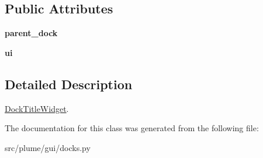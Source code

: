 \subsection*{Public Attributes}
\begin{DoxyCompactItemize}
\item 
{\bfseries parent\+\_\+dock}\hypertarget{classplume-creator_1_1src_1_1plume_1_1gui_1_1docks_1_1_dock_title_widget_a83fb54aa1959a492a67af82ec0f4fce7}{}\label{classplume-creator_1_1src_1_1plume_1_1gui_1_1docks_1_1_dock_title_widget_a83fb54aa1959a492a67af82ec0f4fce7}

\item 
{\bfseries ui}\hypertarget{classplume-creator_1_1src_1_1plume_1_1gui_1_1docks_1_1_dock_title_widget_ad251bdcb53866befe5f7376095aba8fb}{}\label{classplume-creator_1_1src_1_1plume_1_1gui_1_1docks_1_1_dock_title_widget_ad251bdcb53866befe5f7376095aba8fb}

\end{DoxyCompactItemize}


\subsection{Detailed Description}
\hyperlink{classplume-creator_1_1src_1_1plume_1_1gui_1_1docks_1_1_dock_title_widget}{Dock\+Title\+Widget}. 

The documentation for this class was generated from the following file\+:\begin{DoxyCompactItemize}
\item 
src/plume/gui/docks.\+py\end{DoxyCompactItemize}
